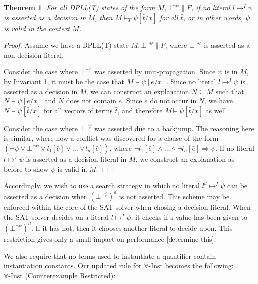 \documentclass{llncs}
\newtheorem{thm}{Theorem}
\begin{document}
\begin{thm}
For all DPLL(T) states of the form $M, \bot^{\neg \psi} \parallel F$, if no literal $l \mapsto^I \psi$ is asserted as a decision in $M$, then $M \models_T \psi[\bar{t}/\bar{x}]$ for all $\bar{t}$, or in other words, $\psi$ is valid in the context $M$.
\end{thm}
\begin{proof}
Assume we have a DPLL(T) state $M, \bot^{\neg \psi} \parallel F$, where $\bot^{\neg \psi}$ is asserted as a non-decision literal.

Consider the case where $\bot^{\neg \psi}$ was asserted by unit-propagation.
Since $\psi$ is in $M$, by Invariant 1, it must be the case that $M \models \psi[\bar{e}/\bar{x}]$.
Since no literal $l \mapsto^I \psi$ is asserted as a decision in $M$, we can construct an explanation $N \subseteq M$ such that $N \models \psi[\bar{e}/\bar{x}]$ and $N$ does not contain $\bar{e}$.
Since $\bar{e}$ do not occur in $N$, we have $N \models \psi[\bar{t}/\bar{x}]$ for all vectors of terms $\bar{t}$, and therefore $M \models \psi[\bar{t}/\bar{x}]$ as well.

Consider the case where $\bot^{\neg \psi}$ was asserted due to a backjump.
The reasoning here is similar, where now a conflict was discovered for a clause of the form $( \neg \psi \vee \bot^{\neg \psi} \vee l_1[\bar{e}] \vee \ldots \vee l_n[\bar{e}])$, where $\neg l_1[\bar{e}] \wedge \ldots \wedge \neg l_n[\bar{e}] \Rightarrow \psi$.
If no literal $l \mapsto^I \psi$ is asserted as a decision literal in $M$, we construct an explanation as before to show $\psi$ is valid in $M$.
$\Box$
\end{proof}

Accordingly, we wish to use a search strategy in which no literal $l^d \mapsto^I \psi$ can be asserted as a decision when $(\bot^{\neg \psi})^d$ is not asserted.
This scheme may be enforced within the core of the SAT solver when chosing a decision literal.
When the SAT solver decides on a literal $l \mapsto^I \psi$, it checks if a value has been given to $(\bot^{\neg \psi})^d$.
If it has not, then it chooses another literal to decide upon.
This restriction gives only a small impact on performance [determine this].

We also require that no terms used to instantiate a quantifier contain instantiation constants.
Our updated rule for $\forall$-Inst becomes the following: \\

\noindent $\forall$-Inst (Counterexample Restricted): \\
\end{document}
